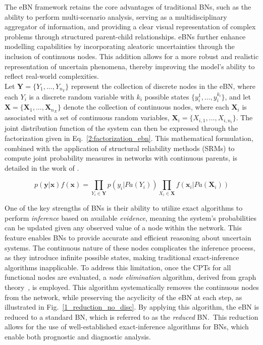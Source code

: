 The eBN framework retains the core advantages of traditional BNs, such as the ability to perform multi-scenario analysis, serving as a multidisciplinary aggregator of information, and providing a clear visual representation of complex problems through structured parent-child relationships. 
eBNs further enhance modelling capabilities by incorporating aleatoric uncertainties through the inclusion of continuous nodes.
This addition allows for a more robust and realistic representation of uncertain phenomena, thereby improving the model's ability to reflect real-world complexities.\\

Let $\mathbf{Y} = \{Y_1, \ldots, Y_{n_Y}\}$ represent the collection of discrete nodes in the eBN, where each $Y_i$ is a discrete random variable with $k_i$ possible states $\{y_i^1, \ldots, y_i^{k_i}\}$, and let $\mathbf{X} = \{\mathbf{X}_1, \ldots, \mathbf{X}_{n_X}\}$ denote the collection of continuous nodes, where each $\mathbf{X}_i$ is associated with a set of continuous random variables, $\mathbf{X}_i = \{X_{i,1}, \ldots, X_{i,n_i}\}$. The joint distribution function of the system can then be expressed through the factorization given in Eq.~\ref{2:factorization_ebn}. 
This mathematical formulation, combined with the application of structural reliability methods (SRMs) to compute joint probability measures in networks with continuous parents, is detailed in the work of \textcite{straub_bayesian_2010}.

\begin{equation}
    \label{2:factorization_ebn}
    p(\mathbf{y}|\mathbf{x})f(\mathbf{x}) = \prod_{Y_i\in \mathbf{Y}} p(y_i|Pa(Y_i)) \prod_{X_i\in \mathbf{X}} f(\mathbf{x}_i|Pa(\mathbf{X}_i)) 
\end{equation}

One of the key strengths of BNs is their ability to utilize exact algorithms to perform \textit{inference} based on available \textit{evidence}, meaning the system's probabilities can be updated given any observed value of a node within the network.
This feature enables BNs to provide accurate and efficient reasoning about uncertain systems. 
The continuous nature of these nodes complicates the inference process, as they introduce infinite possible states, making traditional exact-inference algorithms inapplicable.  
To address this limitation, once the CPTs for all functional nodes are evaluated, a \textit{node elimination} algorithm, derived from graph theory~\cite{Shachter86a}, is employed. 
This algorithm systematically removes the continuous nodes from the network, while preserving the acyclicity of the eBN at each step, as illustrated in Fig.~\ref{1_reduction_no_disc}. 
By applying this algorithm, the eBN is reduced to a standard BN, which is referred to as the \textit{reduced} BN.\ This reduction allows for the use of well-established exact-inference algorithms for BNs, which enable both prognostic and diagnostic analysis. \\

